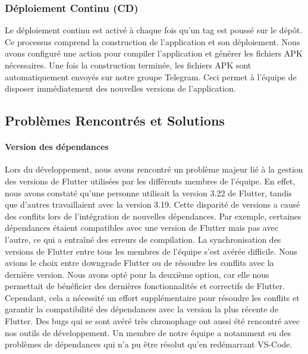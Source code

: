 \subsubsection{Déploiement Continu (CD)}

Le déploiement continu est activé à chaque fois qu'un tag est poussé sur le dépôt. Ce processus comprend la construction de l'application et son déploiement. Nous avons configuré une action pour compiler l'application et générer les fichiers APK nécessaires. Une fois la construction terminée, les fichiers APK sont automatiquement envoyés sur notre groupe Telegram. Ceci permet à l'équipe de disposer immédiatement des nouvelles versions de l'application.

\subsection{Problèmes Rencontrés et Solutions}
\label{sec:problems}

\paragraph{Version des dépendances} Lors du développement, nous avons rencontré un problème majeur lié à la gestion des versions de Flutter utilisées par les différents membres de l'équipe. En effet, nous avons constaté qu'une personne utilisait la version 3.22 de Flutter, tandis que d'autres travaillaient avec la version 3.19. Cette disparité de versions a causé des conflits lors de l'intégration de nouvelles dépendances. Par exemple, certaines dépendances étaient compatibles avec une version de Flutter mais pas avec l'autre, ce qui a entraîné des erreurs de compilation. La synchronisation des versions de Flutter entre tous les membres de l'équipe s'est avérée difficile. Nous avions le choix entre downgrade Flutter ou de résoudre les conflits avec la dernière version. Nous avons opté pour la deuxième option, car elle nous permettait de bénéficier des dernières fonctionnalités et correctifs de Flutter. Cependant, cela a nécessité un effort supplémentaire pour résoudre les conflits et garantir la compatibilité des dépendances avec la version la plus récente de Flutter. Des bugs qui se sont avéré très chronophage ont aussi été rencontré avec nos outils de développement. Un membre de notre équipe a notamment eu des problèmes de dépendances qui n'a pu être résolut qu'en redémarrant VS-Code.

